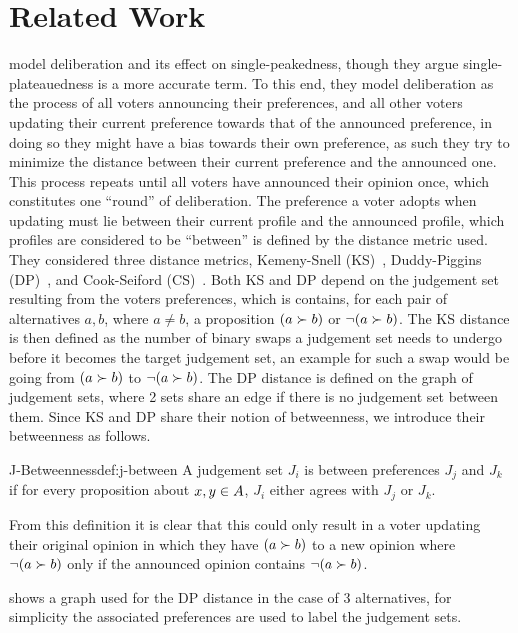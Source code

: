 \section{Related Work} \label{section:related_work}
\citet{radDeliberationSinglePeakednessCoherent2021} model deliberation and its
effect on single-peakedness, though they argue single-plateauedness is a more
accurate term. To this end, they model deliberation as the process of all
voters announcing their preferences, and all other voters updating their
current preference towards that of the announced preference, in doing so they
might have a bias towards their own preference, as such they try to minimize
the distance between their current preference and the announced one. This
process repeats until all voters have announced their opinion once, which
constitutes one ``round'' of deliberation. The preference a voter adopts when
updating must lie between their current profile and the announced profile,
which profiles are considered to be ``between'' is defined by the distance
metric used. They considered three distance metrics, Kemeny-Snell
(KS)~\citep{kemeny1962preference}, Duddy-Piggins
(DP)~\citep{duddyMeasureDistanceJudgment2012}, and Cook-Seiford
(CS)~\citep{cookPriorityRankingConsensus1978}. Both KS and DP depend on the
judgement set resulting from the voters preferences, which is contains, for
each pair of alternatives $a,b$, where $a \neq b$, a proposition $(a \succ b)$ or $\neg (a
	\succ b)$. The KS distance is then defined as the number of binary swaps a
judgement set needs to undergo before it becomes the target judgement set, an
example for such a swap would be going from $(a \succ b)$ to $\neg (a \succ
	b)$. The DP distance is defined on the graph of judgement sets, where 2 sets
share an edge if there is no judgement set between them. Since KS and DP share
their notion of betweenness, we introduce their betweenness as follows.

\begin{definition}{J-Betweenness}{def:j-between} A judgement set $J_i$ is
	between preferences $J_j$ and $J_k$ if for every proposition about $x,y \in
		A$, $J_i$ either agrees with $J_j$ or $J_k$. \end{definition}

From this definition it is clear that this could only result in a voter
updating their original opinion in which they have $(a \succ b)$ to a new
opinion where $\neg (a\succ b)$ only if the announced opinion contains $\neg (a
	\succ b)$.

 shows a graph used for the DP distance in the case of
3 alternatives, for simplicity the associated preferences are used to label the
judgement sets.



